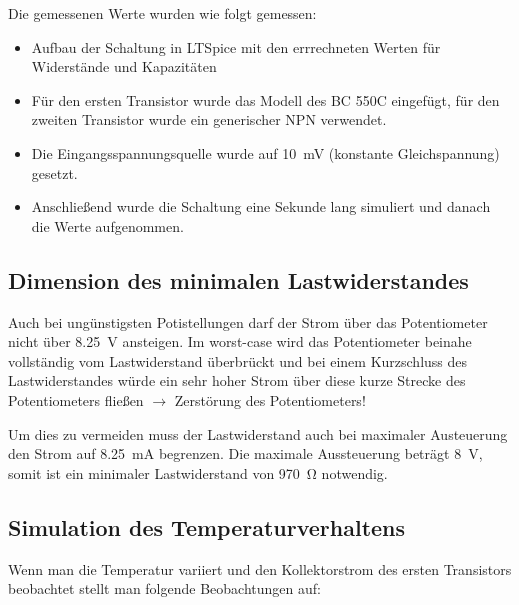 Die gemessenen Werte wurden wie folgt gemessen:
\begin{itemize}
    \item Aufbau der Schaltung in LTSpice mit den errrechneten Werten für Widerstände und Kapazitäten
    \item Für den ersten Transistor wurde das Modell des BC 550C eingefügt, für den zweiten Transistor wurde ein generischer NPN verwendet.
    \item Die Eingangsspannungsquelle wurde auf \SI{10}{\milli \volt} (konstante Gleichspannung) gesetzt.
    \item Anschließend wurde die Schaltung eine Sekunde lang simuliert und danach die Werte aufgenommen.
\end{itemize}

\subsection{Dimension des minimalen Lastwiderstandes}

Auch bei ungünstigsten Potistellungen darf der Strom über das Potentiometer nicht über \SI{8.25}{\volt} ansteigen.
Im worst-case wird das Potentiometer beinahe vollständig vom Lastwiderstand überbrückt und bei einem Kurzschluss des Lastwiderstandes würde ein sehr hoher Strom über diese kurze Strecke des Potentiometers fließen $\rightarrow$ Zerstörung des Potentiometers!

Um dies zu vermeiden muss der Lastwiderstand auch bei maximaler Austeuerung den Strom auf \SI{8.25}{\milli \ampere} begrenzen. Die maximale Aussteuerung beträgt \SI{8}{\volt}, somit ist ein minimaler Lastwiderstand von \SI{970}{\ohm} notwendig.

\subsection{Simulation des Temperaturverhaltens}

Wenn man die Temperatur variiert und den Kollektorstrom des ersten Transistors beobachtet stellt man folgende Beobachtungen auf:

